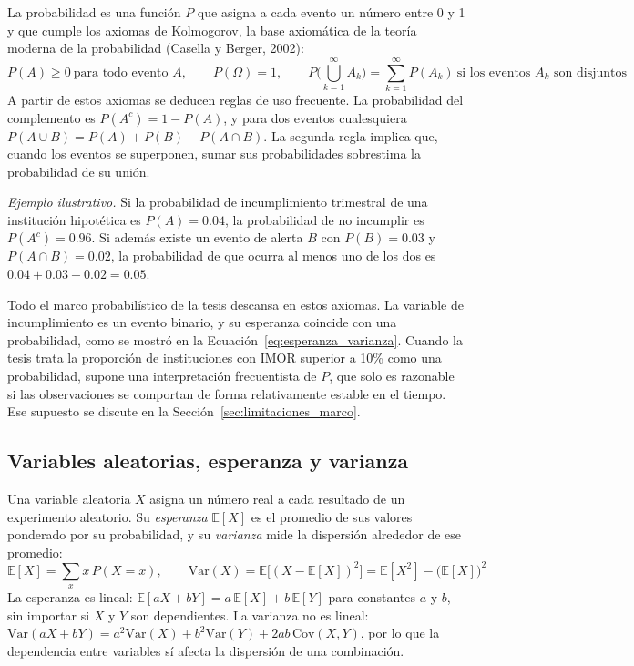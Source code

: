 La probabilidad es una función $P$ que asigna a cada evento un número entre 0 y 1 y que cumple los axiomas de Kolmogorov, la base axiomática de la teoría moderna de la probabilidad (Casella y Berger, 2002):
\begin{equation}
P(A)\geq 0 \ \text{para todo evento } A, \qquad P(\Omega)=1, \qquad P\Big(\bigcup_{k=1}^{\infty} A_k\Big)=\sum_{k=1}^{\infty} P(A_k)\ \text{si los eventos } A_k \text{ son disjuntos}
\label{eq:kolmogorov}
\end{equation}
A partir de estos axiomas se deducen reglas de uso frecuente. La probabilidad del complemento es $P(A^c)=1-P(A)$, y para dos eventos cualesquiera $P(A\cup B)=P(A)+P(B)-P(A\cap B)$. La segunda regla implica que, cuando los eventos se superponen, sumar sus probabilidades sobrestima la probabilidad de su unión.

\textit{Ejemplo ilustrativo.} Si la probabilidad de incumplimiento trimestral de una institución hipotética es $P(A)=0.04$, la probabilidad de no incumplir es $P(A^c)=0.96$. Si además existe un evento de alerta $B$ con $P(B)=0.03$ y $P(A\cap B)=0.02$, la probabilidad de que ocurra al menos uno de los dos es $0.04+0.03-0.02=0.05$.

Todo el marco probabilístico de la tesis descansa en estos axiomas. La variable de incumplimiento es un evento binario, y su esperanza coincide con una probabilidad, como se mostró en la Ecuación~\eqref{eq:esperanza_varianza}. Cuando la tesis trata la proporción de instituciones con IMOR superior a 10\% como una probabilidad, supone una interpretación frecuentista de $P$, que solo es razonable si las observaciones se comportan de forma relativamente estable en el tiempo. Ese supuesto se discute en la Sección~\ref{sec:limitaciones_marco}.

\subsection{Variables aleatorias, esperanza y varianza}
Una variable aleatoria $X$ asigna un número real a cada resultado de un experimento aleatorio. Su \textit{esperanza} $\mathbb{E}[X]$ es el promedio de sus valores ponderado por su probabilidad, y su \textit{varianza} mide la dispersión alrededor de ese promedio:
\begin{equation}
\mathbb{E}[X] = \sum_x x\,P(X=x), \qquad \text{Var}(X) = \mathbb{E}\big[(X-\mathbb{E}[X])^2\big] = \mathbb{E}[X^2]-\big(\mathbb{E}[X]\big)^2
\label{eq:esperanza_varianza}
\end{equation}
La esperanza es lineal: $\mathbb{E}[aX+bY]=a\,\mathbb{E}[X]+b\,\mathbb{E}[Y]$ para constantes $a$ y $b$, sin importar si $X$ y $Y$ son dependientes. La varianza no es lineal: $\text{Var}(aX+bY)=a^2\text{Var}(X)+b^2\text{Var}(Y)+2ab\,\text{Cov}(X,Y)$, por lo que la dependencia entre variables sí afecta la dispersión de una combinación.

